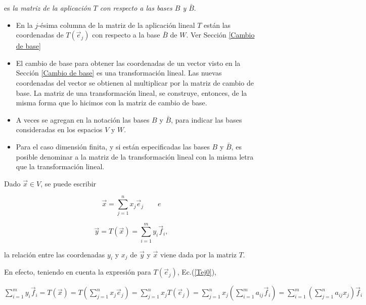 \bigskip

\noindent
es \textit{la matriz de la aplicación $T$ con respecto a las bases  $B$ y $\bar{B}$}.

\bigskip

\begin{remark}
\begin{itemize}
\item
En la $j$-ésima columna de la matriz de la aplicación lineal $T$ están las coordenadas de $T(\vec{e}_j)$ con respecto a la base $\bar{B}$ de $W$. Ver Sección \ref{Cambio de base}
\item
El cambio de base para obtener las coordenadas de un vector visto en la Sección \ref{Cambio de base} es una transformación lineal. Las nuevas coordenadas del vector se obtienen al multiplicar por la matriz de cambio de base. La matriz de una transformación lineal, se construye, entonces, de la misma forma que lo hicimos con la matriz de  cambio de base. 

\item
A veces se agregan en la notación  las bases $B$ y $\bar{B}$, para indicar las bases consideradas en los espacios $V$ y $W$. 
\item
Para el caso dimensión finita, y si están especificadas las bases $B$ y $\bar{B}$, es posible denominar a la matriz de la transformación lineal con la misma letra que la transformación lineal.   

\end{itemize}
\end{remark}



\bigskip

\bigskip


Dado $\vec{x}\in V $, se puede  escribir

$$\vec{x}=\sum_{j=1}^{n}x_{j}\vec{e}_j \qquad e $$ 

$$\vec{y}= T(\vec{x})=\sum_{i=1}^{m}y_{i}\vec{f}_i,$$


\bigskip


\noindent
la relación  entre las coordenadas $y_i$ y $x_j$ de $\Vec{y}$ y $\Vec{x}$ viene dada por la matriz $T$. 

\bigskip

\bigskip

En efecto, teniendo en cuenta la expresión para $ T (\vec{e}_j)$, Ec.(\ref{Tej0}),

\bigskip

\bigskip

$\sum_{i=1}^{m}y_{i}\vec{f}_i= T(\vec{x})=T(\sum_{j=1}^{n}x_{j}\vec{e}_j)=\sum_{j=1}^{n}x_{j}T(\vec{e}_j)=\sum_{j=1}^{n}x_{j}(\sum_{i=1}^{m}a_{ij}\vec{f}_i )=\sum_{i=1}^{m}(\sum_{j=1}^{n}a_{ij}x_{j})\vec{f}_i$

